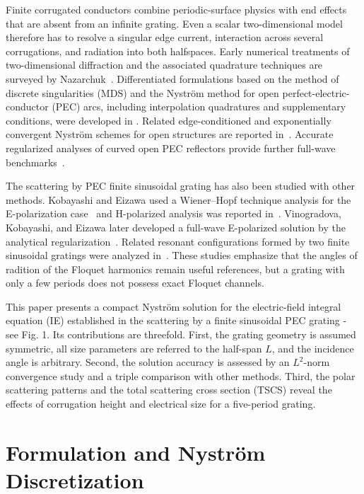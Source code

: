 \documentclass[conference]{IEEEtran}
\begin{document}
Finite corrugated conductors combine periodic-surface physics with end effects
that are absent from an infinite grating.  Even a scalar two-dimensional model
therefore has to resolve a singular edge current, interaction across several
corrugations, and radiation into both halfspaces.  Early numerical treatments
of two-dimensional diffraction and the associated quadrature techniques are
surveyed by Nazarchuk~\cite{nazarchuk1989}.  Differentiated formulations based
on the method of discrete singularities (MDS) and the Nystr\"om method for open
perfect-electric-conductor (PEC) arcs, including interpolation quadratures and
supplementary conditions, were developed in
\cite{nosich2005,nosich2007,nosich_josa2007,gandel2010}.  Related
edge-conditioned and exponentially convergent Nystr\"om schemes for open
structures are reported in~\cite{tong2006,tsalamengas2006,shapoval2011}.
Accurate regularized analyses of curved open PEC reflectors provide further
full-wave benchmarks~\cite{oguzer2001,oguzer2009}.

The scattering by PEC finite sinusoidal grating has also been studied with other
methods.  Kobayashi and Eizawa used a Wiener--Hopf technique analysis for the 
E-polarization case~\cite{kobayashi1991} and H-polarized analysis was reported
in~\cite{eizawa2014}.  Vinogradova, Kobayashi, and Eizawa later developed a
full-wave E-polarized solution by the analytical regularization~\cite{vinogradova2019}.
Related resonant configurations formed by two finite sinusoidal gratings were
analyzed in~\cite{vinogradova2021}.  These studies emphasize that the angles of radition
of the Floquet harmonics remain useful references, but a grating with only a few periods
does not possess exact Floquet channels.

This paper presents a compact Nystr\"om solution for the electric-field integral equation 
(IE) established in the scattering by a finite sinusoidal PEC grating - see Fig. 1.  Its 
contributions are threefold.  First, the grating geometry is assumed symmetric,
all size parameters are referred to the half-span $L$, and the incidence angle
is arbitrary.  Second, the solution accuracy is assessed by an
$L^2$-norm convergence study and a triple comparison with other methods.  Third,
the polar scattering patterns and the total scattering cross section (TSCS) reveal 
the effects of corrugation height and electrical size for a five-period grating.

\section{Formulation and Nystr\"om Discretization}
\label{sec:method}
\end{document}
